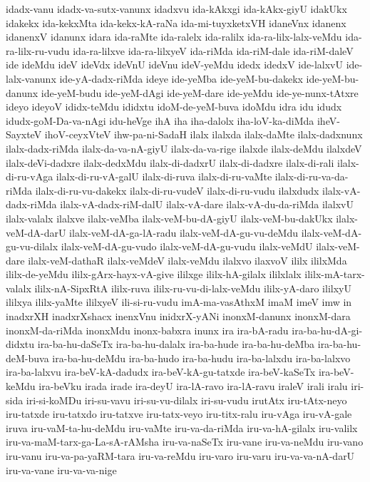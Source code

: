 {idadx-vanu
idadx-va-sutx-vanunx
idadxvu
ida-kAkxgi
ida-kAkx-giyU
idakUkx
idakekx
ida-kekxMta
ida-kekx-kA-raNa
ida-mi-tuyxketxVH
idaneVnx
idanenx
idanenxV
idanunx
idara
ida-raMte
ida-ralelx
ida-ralilx
ida-ra-lilx-lalx-veMdu
ida-ra-lilx-ru-vudu
ida-ra-lilxve
ida-ra-lilxyeV
ida-riMda
ida-riM-dale
ida-riM-daleV
ide
ideMdu
ideV
ideVdx
ideVnU
ideVnu
ideV-yeMdu
idedx
idedxV
ide-lalxvU
ide-lalx-vanunx
ide-yA-dadx-riMda
ideye
ide-yeMba
ide-yeM-bu-dakekx
ide-yeM-bu-danunx
ide-yeM-budu
ide-yeM-dAgi
ide-yeM-dare
ide-yeMdu
ide-ye-nunx-tAtxre
ideyo
ideyoV
ididx-teMdu
ididxtu
idoM-de-yeM-buva
idoMdu
idra
idu
idudx
idudx-goM-Da-va-nAgi
idu-heVge
ihA
iha
iha-dalolx
iha-loV-ka-diMda
iheV-SayxteV
ihoV-ceyxVteV
ihw-pa-ni-SadaH
ilalx
ilalxda
ilalx-daMte
ilalx-dadxnunx
ilalx-dadx-riMda
ilalx-da-va-nA-giyU
ilalx-da-va-rige
ilalxde
ilalx-deMdu
ilalxdeV
ilalx-deVi-dadxre
ilalx-dedxMdu
ilalx-di-dadxrU
ilalx-di-dadxre
ilalx-di-rali
ilalx-di-ru-vAga
ilalx-di-ru-vA-galU
ilalx-di-ruva
ilalx-di-ru-vaMte
ilalx-di-ru-va-da-riMda
ilalx-di-ru-vu-dakekx
ilalx-di-ru-vudeV
ilalx-di-ru-vudu
ilalxdudx
ilalx-vA-dadx-riMda
ilalx-vA-dadx-riM-dalU
ilalx-vA-dare
ilalx-vA-du-da-riMda
ilalxvU
ilalx-valalx
ilalxve
ilalx-veMba
ilalx-veM-bu-dA-giyU
ilalx-veM-bu-dakUkx
ilalx-veM-dA-darU
ilalx-veM-dA-ga-lA-radu
ilalx-veM-dA-gu-vu-deMdu
ilalx-veM-dA-gu-vu-dilalx
ilalx-veM-dA-gu-vudo
ilalx-veM-dA-gu-vudu
ilalx-veMdU
ilalx-veM-dare
ilalx-veM-dathaR
ilalx-veMdeV
ilalx-veMdu
ilalxvo
ilaxvoV
ililx
ililxMda
ililx-de-yeMdu
ililx-gArx-hayx-vA-give
ililxge
ililx-hA-gilalx
ililxlalx
ililx-mA-tarx-valalx
ililx-nA-SipxRtA
ililx-ruva
ililx-ru-vu-di-lalx-veMdu
ililx-yA-daro
ililxyU
ililxya
ililx-yaMte
ililxyeV
ili-si-ru-vudu
imA-ma-vasAthxM
imaM
imeV
imw
in
inadxrXH
inadxrXshacx
inenxVnu
inidxrX-yANi
inonxM-danunx
inonxM-dara
inonxM-da-riMda
inonxMdu
inonx-babxra
inunx
ira
ira-bA-radu
ira-ba-hu-dA-gi-didxtu
ira-ba-hu-daSeTx
ira-ba-hu-dalalx
ira-ba-hude
ira-ba-hu-deMba
ira-ba-hu-deM-buva
ira-ba-hu-deMdu
ira-ba-hudo
ira-ba-hudu
ira-ba-lalxdu
ira-ba-lalxvo
ira-ba-lalxvu
ira-beV-kA-dadudx
ira-beV-kA-gu-tatxde
ira-beV-kaSeTx
ira-beV-keMdu
ira-beVku
irada
irade
ira-deyU
ira-lA-ravo
ira-lA-ravu
iraleV
irali
iralu
iri-sida
iri-si-koMDu
iri-su-vavu
iri-su-vu-dilalx
iri-su-vudu
irutAtx
iru-tAtx-neyo
iru-tatxde
iru-tatxdo
iru-tatxve
iru-tatx-veyo
iru-titx-ralu
iru-vAga
iru-vA-gale
iruva
iru-vaM-ta-hu-deMdu
iru-vaMte
iru-va-da-riMda
iru-va-hA-gilalx
iru-valilx
iru-va-maM-tarx-ga-La-sA-rAMsha
iru-va-naSeTx
iru-vane
iru-va-neMdu
iru-vano
iru-vanu
iru-va-pa-yaRM-tara
iru-va-reMdu
iru-varo
iru-varu
iru-va-va-nA-darU
iru-va-vane
iru-va-va-nige
}
